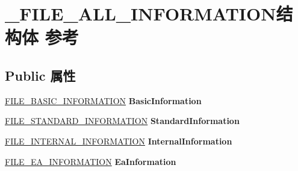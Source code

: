 \hypertarget{struct___f_i_l_e___a_l_l___i_n_f_o_r_m_a_t_i_o_n}{}\section{\+\_\+\+F\+I\+L\+E\+\_\+\+A\+L\+L\+\_\+\+I\+N\+F\+O\+R\+M\+A\+T\+I\+O\+N结构体 参考}
\label{struct___f_i_l_e___a_l_l___i_n_f_o_r_m_a_t_i_o_n}
\subsection*{Public 属性}
\begin{DoxyCompactItemize}
\item 
\mbox{\label{struct___f_i_l_e___a_l_l___i_n_f_o_r_m_a_t_i_o_n_ae930f3e8e6529ff8782d2969b995a97b}} 
\hyperlink{struct___f_i_l_e___b_a_s_i_c___i_n_f_o_r_m_a_t_i_o_n}{F\+I\+L\+E\+\_\+\+B\+A\+S\+I\+C\+\_\+\+I\+N\+F\+O\+R\+M\+A\+T\+I\+ON} {\bfseries Basic\+Information}
\item 
\mbox{\label{struct___f_i_l_e___a_l_l___i_n_f_o_r_m_a_t_i_o_n_a2312ddaf0995979b8b7ebdcae816c31d}} 
\hyperlink{struct___f_i_l_e___s_t_a_n_d_a_r_d___i_n_f_o_r_m_a_t_i_o_n}{F\+I\+L\+E\+\_\+\+S\+T\+A\+N\+D\+A\+R\+D\+\_\+\+I\+N\+F\+O\+R\+M\+A\+T\+I\+ON} {\bfseries Standard\+Information}
\item 
\mbox{\label{struct___f_i_l_e___a_l_l___i_n_f_o_r_m_a_t_i_o_n_a3267809890ce4eba5567900b34e6839d}} 
\hyperlink{struct___f_i_l_e___i_n_t_e_r_n_a_l___i_n_f_o_r_m_a_t_i_o_n}{F\+I\+L\+E\+\_\+\+I\+N\+T\+E\+R\+N\+A\+L\+\_\+\+I\+N\+F\+O\+R\+M\+A\+T\+I\+ON} {\bfseries Internal\+Information}
\item 
\mbox{\label{struct___f_i_l_e___a_l_l___i_n_f_o_r_m_a_t_i_o_n_a2ed7719597fbb066eae92ee5cf549ef9}} 
\hyperlink{struct___f_i_l_e___e_a___i_n_f_o_r_m_a_t_i_o_n}{F\+I\+L\+E\+\_\+\+E\+A\+\_\+\+I\+N\+F\+O\+R\+M\+A\+T\+I\+ON} {\bfseries Ea\+Information}
\item 
\mbox{\label{struct___f_i_l_e___a_l_l___i_n_f_o_r_m_a_t_i_o_n_a9a18afde135a0bc9e480b72563e2f9c2}} 

\end{DoxyCompactItemize}
